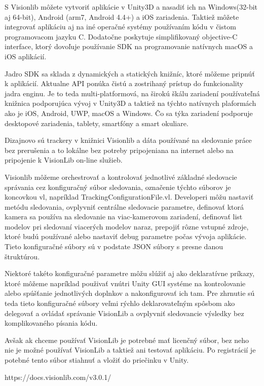 S Visionlib môžete vytvoriť aplikácie v Unity3D a nasadiť ich na Windows(32-bit aj 64-bit), Android (arm7, Android 4.4+) a iOS zariadenia. Taktiež môžete integrovať aplikáciu aj na iné operačné systémy používaním kódu v čistom programovacom jazyku C. Dodatočne poskytuje simplifikovaný objective-C interface, ktorý dovoľuje používanie SDK na programovanie natívnych macOS a iOS aplikácií. 

Jadro SDK sa sklada z dynamických a statických knižníc, ktoré môžeme pripnúť k aplikácií. Aktualne API ponúka čistú a zostrihaný prístup do funkcionality jadra enginu. Je to teda multi-platformová, na širokú škálu zariadení používateľná knižnica podporujúca vývoj v Unity3D a taktiež na týchto natívnych plaformách ako je iOS, Android, UWP, macOS a Windows. Čo sa týka zariadení podporuje desktopové zariadenia, tablety, smartfóny a smart okuliare. 

Dizajnovo sú trackery v knižnici Visionlib a dáta používané na sledovanie práce bez prerušenia a to lokálne bez potreby pripojeniana na internet alebo na pripojenie k VisionLib on-line služieb.

Visionlib môžeme orchestrovať a kontrolovať jednotlivé základné sledovacie správania cez konfiguračný súbor sledovania, označenie týchto súborov je koncovkou vl, napríklad TrackingConfigurationFile.vl. Developeri môžu nastaviť metódu sledovania, ovplyvniť centrálne sledovacie parametre, definovať ktorá kamera sa používa na sledovanie na viac-kamerovom zariadení, definovať list modelov pri sledovaní viacerých modelov naraz, prepojiť rôzne vstupné zdroje, ktoré budú používané alebo nastaviť debug parametre počas vývoja aplikácie. Tieto konfiguračné súbory sú v podstate JSON súbory s presne danou štruktúrou.

Niektoré takéto konfiguračné parametre môžu slúžiť aj ako deklaratívne príkazy, ktoré môžeme napríklad použivať vnútri Unity GUI systéme na kontrolovanie alebo spúšťanie jednotlivých doplnkov a nakonfigurovať ich tam. Pre zhrnutie sú teda tieto konfiguračné súbory veľmi rýchlo deklarovateľným spôsbom ako delegovať a ovládať správanie VisionLib a ovplyvniť sledovancie výsledky bez komplikovaného písania kódu. 

Avšak ak chceme používať VisionLib je potrebné mať licenčný súbor, bez neho nie je možné používať VisionLib a taktiež ani testovať aplikáciu. Po registrácií je potebné tento súbor stiahnuť a vložiť do priečinku v Unity.

https://docs.visionlib.com/v3.0.1/

